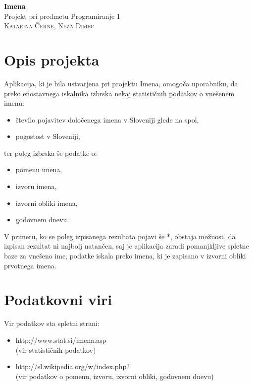\documentclass[a4paper, 12pt]{article}
\begin{document}
\begin{center}
{\huge\textbf{Imena}}\\
{\large{Projekt pri predmetu Programiranje 1}}\\
{\large\textsc{Katarina Černe, Neža Dimec}}
\end{center}

\tableofcontents

\section{Opis projekta}

Aplikacija, ki je bila ustvarjena pri projektu Imena, omogoča uporabniku, da preko enostavnega iskalnika izbrska nekaj statističnih podatkov o vnešenem imenu:

\begin{itemize}
\item število pojavitev določenega imena v Sloveniji glede na spol,
\item pogostost v Sloveniji,
\end{itemize}

\noindent ter poleg izbrska še podatke o:

\begin{itemize}
\item pomenu imena,
\item izvoru imena,
\item izvorni obliki imena,
\item godovnem dnevu.
\end{itemize}

V primeru, ko se poleg izpisanega rezultata pojavi še *, obstaja možnost, da izpisan rezultat ni najbolj natančen, saj je aplikacija zaradi pomanjkljive spletne baze za vnešeno ime, podatke iskala preko imena, ki je zapisano v izvorni obliki prvotnega imena.

\section {Podatkovni viri}

Vir podatkov sta spletni strani:
\begin{itemize}
\item http://www.stat.si/imena.asp\\
(vir statističnih podatkov)
\item http://sl.wikipedia.org/w/index.php?\\
(vir podatkov o pomenu, izvoru, izvorni obliki, godovnem dnevu)
\end{itemize}
\end{document}
